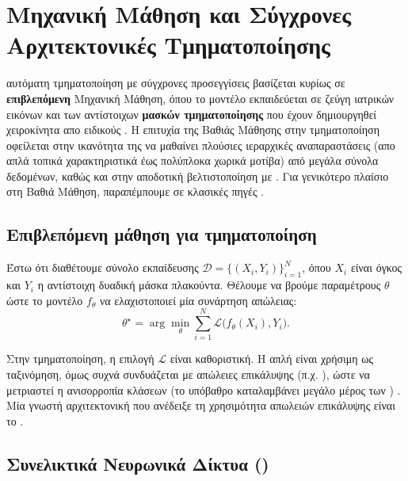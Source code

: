 \chapter{Μηχανική Μάθηση και Σύγχρονες Αρχιτεκτονικές Τμηματοποίησης}
\label{ch:ml_dl_models}

 αυτόματη τμηματοποίηση με σύγχρονες προσεγγίσεις βασίζεται κυρίως σε \textbf{επιβλεπόμενη} Μηχανική Μάθηση,
όπου το μοντέλο εκπαιδεύεται σε ζεύγη ιατρικών εικόνων και των αντίστοιχων \textbf{μασκών τμηματοποίησης} που έχουν δημιουργηθεί χειροκίνητα απο ειδικούς \cite{litjens2017survey}.
Η επιτυχία της Βαθιάς Μάθησης στην τμηματοποίηση
οφείλεται στην ικανότητα της να μαθαί\-νει πλούσιες ιεραρχικές αναπαραστάσεις (απο απλά τοπικά χαρακτηριστικά έως πολύπλοκα χωρικά μοτίβα) από μεγάλα σύνολα δεδομένων, καθώς και στην
αποδοτική βελτιστοποίηση με . Για γενικότερο πλαίσιο στη Βαθιά Μάθηση, παραπέμπουμε σε
κλασικές πηγές \cite{litjens2017survey, goodfellow2016deep, bishop2006pattern}.

\section{Επιβλεπόμενη μάθηση για τμηματοποίηση}
\label{sec:supervised_seg}

Έστω ότι διαθέτουμε σύνολο εκπαίδευσης $\mathcal{D}=\{(X_i, Y_i)\}_{i=1}^{N}$, όπου $X_i$ είναι  όγκος και $Y_i$
η αντίστοιχη δυαδική μάσκα πλακούντα. Θέλουμε να βρούμε παραμέτρους $\theta$ ώστε το μοντέλο $f_\theta$ να ελαχιστοποιεί
μία συνάρτηση απώλειας:
\begin{equation}
\theta^\star = \arg\min_{\theta} 
\sum_{i=1}^{N} \mathcal{L}\big(f_\theta(X_i), Y_i\big).
\end{equation}

Στην τμηματοποίηση, η επιλογή $\mathcal{L}$ είναι καθοριστική. Η απλή  είναι χρήσιμη ως  ταξινόμηση, όμως συχνά 
συνδυάζεται με απώλειες επικάλυψης (π.χ. ), ώστε να μετριαστεί η ανισορροπία κλάσεων (το υπόβαθρο
καταλαμβάνει μεγάλο μέρος των ) \cite{sudre2017gdl}. Μία γνωστή  αρχιτεκτονική που ανέδειξε τη χρησιμότητα 
απωλειών επικάλυψης είναι το  \cite{milletari2016vnet}.

\section{Συνελικτικά Νευρωνικά Δίκτυα ()}
\label{sec:cnns}


